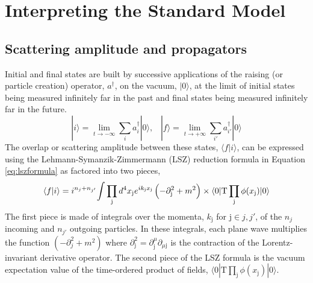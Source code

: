 \section{Interpreting the Standard Model}
\subsection{Scattering amplitude and propagators}
 Initial and final states %
  are built by successive applications
  of the raising (or particle creation) operator, $a^\dagger$,
  on the vacuum, $|0\rangle$, at the limit of initial states being
  measured infinitely far in the past and 
  final states being measured infinitely far in the future.
\begin{equation}
 |i\rangle = \lim_{t\rightarrow -\infty}  \sum_i a_i^\dagger |0\rangle, \;\;\;
 |f\rangle = \lim_{t\rightarrow +\infty}  \sum_{i'} a_{i'}^\dagger |0\rangle
\end{equation}
 The overlap or scattering amplitude between these states,
  $\langle f | i \rangle$,
  can be expressed using the Lehmann-Symanzik-Zimmermann (LSZ)
  reduction formula in Equation \ref{eq:lszformula}
  as factored into two pieces,
\begin{equation}\label{eq:lszformula}
 \langle f | i \rangle = i^{n_j + n_{j'}} {\Large \int}
   \prod_{\mathrm{j}} d^4 x_{\mathrm{j}}
   e^{ik_{\mathrm{j}} x_{\mathrm{j}} }
   \left(-\partial^2_{\mathrm{j}} + m^2 \right)
 \times
\langle 0 | \mathrm{T}\prod_{\mathrm{j}} \phi(x_{\mathrm{j}}) | 0 \rangle
\end{equation}
 The first piece is made of integrals over the
  momenta, $k_{\mathrm{j}}$ for $\mathrm{j}\in j,j'$,
  of the $n_j$ incoming and 
  $n_{j'}$ outgoing particles.
 In these integrals, each plane wave
  multiplies the function $(-\partial^2_j + m^2)$ 
  where $\partial^2_{\mathrm{j}} = \partial^\mu_{\mathrm{j}}\partial_{\mu\mathrm{j}}$
  is the contraction of the Lorentz-invariant derivative operator.
 The second piece of the LSZ formula is the 
  vacuum expectation value of the time-ordered
  product of fields, $\langle 0 |
   \mathrm{T} \prod_\mathrm{j} \phi(x_\mathrm{j}) |
   0 \rangle$.

